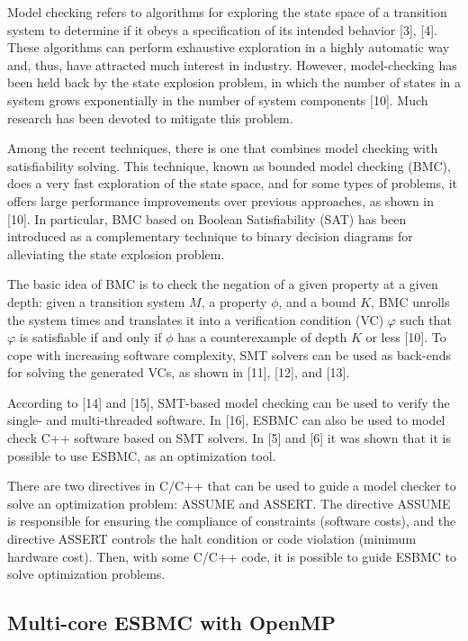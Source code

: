 Model checking refers to algorithms for exploring the state space of a transition system to determine if it obeys a speciﬁcation of its intended behavior [3], [4]. These algorithms can perform exhaustive exploration in a highly automatic way and, thus, have attracted much interest in industry. However, model-checking has been held back by the state explosion problem, in which the number of states in a system grows exponentially in the number of system components [10]. Much research has been devoted to mitigate this problem.

Among the recent techniques, there is one that combines model checking with satisﬁability solving. This technique, known as bounded model checking (BMC), does a very fast exploration of the state space, and for some types of problems, it offers large performance improvements over previous approaches, as shown in [10]. In particular, BMC based on Boolean Satisfiability (SAT) has been introduced as a complementary technique to binary decision diagrams for alleviating the state explosion problem. 

The basic idea of BMC is to check the negation of a given property at a given depth: given a transition system $ M $, a property $ \phi $, and a bound $ K $, BMC unrolls the system  times and translates it into a verification condition (VC) $ \varphi $  such that $ \varphi $   is satisfiable if and only if $ \phi $ has a counterexample of depth $ K $ or less [10]. To cope with increasing software complexity, SMT solvers can be used as back-ends for solving the generated VCs, as shown in [11], [12], and [13]. 

According to [14] and [15], SMT-based model checking can be used to verify the single- and multi-threaded software. In [16], ESBMC can also be used to model check C++ software based on SMT solvers. In [5] and [6] it was shown that it is possible to use ESBMC, as an optimization tool.

There are two directives in C/C++ that can be used to guide a model checker to solve an optimization problem: ASSUME and ASSERT. The directive ASSUME is responsible for ensuring the compliance of constraints (software costs), and the directive ASSERT controls the halt condition or code violation (minimum hardware cost). Then, with some C/C++ code, it is possible to guide ESBMC to solve optimization problems.

\subsection{Multi-core ESBMC with OpenMP}

